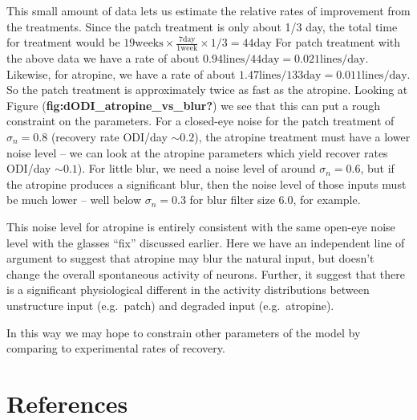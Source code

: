 \documentclass[
  letterpaper,
  DIV=11,
  numbers=noendperiod]{scrreprt}
\begin{document}
This small amount of data lets us estimate the relative rates of
improvement from the treatments. Since the patch treatment is only about
1/3 day, the total time for treatment would be
\(19 \text{weeks}\times \frac{7 \text{day}}{1 \text{week}}\times 1/3=44 \text{day}\)
For patch treatment with the above data we have a rate of about
\(0.94 \text{lines} / 44 \text{day}=0.021 \text{lines}/\text{day}\).
Likewise, for atropine, we have a rate of about
\(1.47\text{lines} / 133 \text{day}=0.011 \text{lines}/\text{day}\). So
the patch treatment is approximately twice as fast as the atropine.
Looking at Figure (\textbf{fig:dODI\_atropine\_vs\_blur?}) we see that
this can put a rough constraint on the parameters. For a closed-eye
noise for the patch treatment of \(\sigma_n=0.8\) (recovery rate ODI/day
\(\sim 0.2\)), the atropine treatment must have a lower noise level --
we can look at the atropine parameters which yield recover rates ODI/day
\(\sim 0.1\)). For little blur, we need a noise level of around
\(\sigma_n=0.6\), but if the atropine produces a significant blur, then
the noise level of those inputs must be much lower -- well below
\(\sigma_n=0.3\) for blur filter size 6.0, for example.

This noise level for atropine is entirely consistent with the same
open-eye noise level with the glasses ``fix'' discussed earlier. Here we
have an independent line of argument to suggest that atropine may blur
the natural input, but doesn't change the overall spontaneous activity
of neurons. Further, it suggest that there is a significant
physiological different in the activity distributions between
unstructure input (e.g.~patch) and degraded input (e.g.~atropine).

In this way we may hope to constrain other parameters of the model by
comparing to experimental rates of recovery.

\hypertarget{section-2}{%
\chapter{}\label{section-2}}


\hypertarget{references}{%
\chapter*{References}\label{references}}
\end{document}
